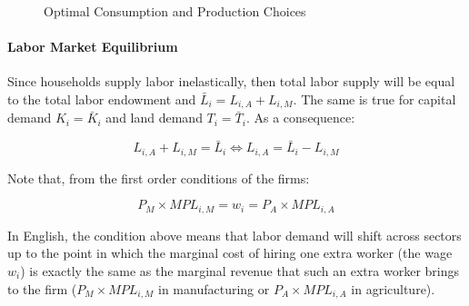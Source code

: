 \documentclass[11pt,letterpaper]{article}
\begin{document}
\begin{figure}
    
    \caption{Optimal Consumption and Production Choices}
    \label{fig: consumption}
\end{figure}


\paragraph{Labor Market Equilibrium} Since households supply labor inelastically, then total labor supply will be equal to the total labor endowment and $\bar{L}_i = L_{i,A} + L_{i,M}$. The same is true for capital demand $K_i = \bar{K}_i$ and land demand $T_i = \bar{T}_i$. As a consequence:

\begin{equation} \label{eq: l-constraint}
    L_{i,A} + L_{i,M} = \bar{L}_i \iff L_{i,A} =  \bar{L}_i -  L_{i,M}
\end{equation}

Note that, from the first order conditions of the firms:

\begin{equation} \label{eq: equal-wage}
   P_M \times MPL_{i,M} = w_i = P_A \times MPL_{i,A}
\end{equation}

In English, the condition above means that labor demand will shift across sectors up to the point in which the marginal cost of hiring one extra worker (the wage $w_i$) is exactly the same as the marginal revenue that such an extra worker brings to the firm ($P_M \times MPL_{i,M}$ in manufacturing or $P_A \times MPL_{i,A}$ in agriculture).
\end{document}
